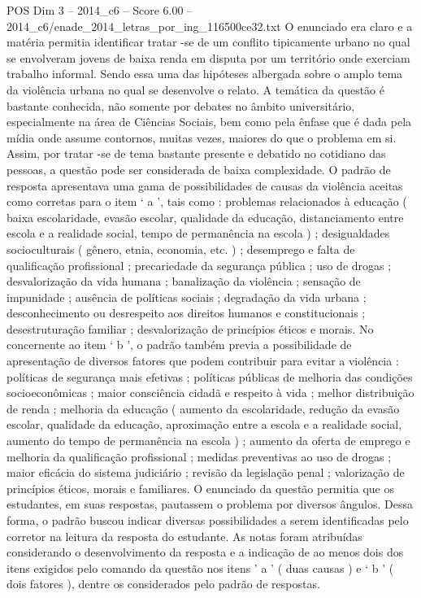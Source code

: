 \begin{textsample}{POS Dim 3 – 2014\_c6 – Score 6.00 – 2014\_c6/enade\_2014\_letras\_por\_ing\_116500ce32.txt}
O enunciado era claro e a matéria permitia identificar tratar -se de um conflito tipicamente urbano no qual se envolveram jovens de baixa renda em disputa por um território onde exerciam trabalho informal.
Sendo essa uma das hipóteses albergada sobre o amplo tema da violência urbana no qual se desenvolve o relato.
A temática da questão é bastante conhecida, não somente por debates no âmbito universitário, especialmente na área de Ciências Sociais, bem como pela ênfase que é dada pela mídia onde assume contornos, muitas vezes, maiores do que o problema em si.
Assim, por tratar -se de tema bastante presente e debatido no cotidiano das pessoas, a questão pode ser considerada de baixa complexidade.
O padrão de resposta apresentava uma gama de possibilidades de causas da violência aceitas como corretas para o item ‘ a ’, tais como : problemas relacionados à educação ( baixa escolaridade, evasão escolar, qualidade da educação, distanciamento entre escola e a realidade social, tempo de permanência na escola ) ; desigualdades socioculturais ( gênero, etnia, economia, etc. ) ; desemprego e falta de qualificação profissional ; precariedade da segurança pública ; uso de drogas ; desvalorização da vida humana ; banalização da violência ; sensação de impunidade ; ausência de políticas sociais ; degradação da vida urbana ; desconhecimento ou desrespeito aos direitos humanos e constitucionais ; desestruturação familiar ; desvalorização de princípios éticos e morais.
No concernente ao item ‘ b ’, o padrão também previa a possibilidade de apresentação de diversos fatores que podem contribuir para evitar a violência : políticas de segurança mais efetivas ; políticas públicas de melhoria das condições socioeconômicas ; maior consciência cidadã e respeito à vida ; melhor distribuição de renda ; melhoria da educação ( aumento da escolaridade, redução da evasão escolar, qualidade da educação, aproximação entre a escola e a realidade social, aumento do tempo de permanência na escola ) ; aumento da oferta de emprego e melhoria da qualificação profissional ; medidas preventivas ao uso de drogas ; maior eficácia do sistema judiciário ; revisão da legislação penal ; valorização de princípios éticos, morais e familiares.
O enunciado da questão permitia que os estudantes, em suas respostas, pautassem o problema por diversos ângulos.
Dessa forma, o padrão buscou indicar diversas possibilidades a serem identificadas pelo corretor na leitura da resposta do estudante.
As notas foram atribuídas considerando o desenvolvimento da resposta e a indicação de ao menos dois dos itens exigidos pelo comando da questão nos itens ’ a ’ ( duas causas ) e ‘ b ’ ( dois fatores ), dentre os considerados pelo padrão de respostas.

\end{textsample}

